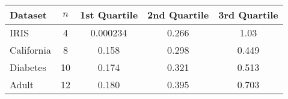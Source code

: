 \begin{tabular}{lcccc}
    \toprule
    Dataset & $n$ & 1st Quartile & 2nd Quartile & 3rd Quartile \\
    \midrule
    IRIS & 4 & 0.000234 & 0.266 & 1.03 \\
    California & 8 & 0.158 & 0.298 & 0.449 \\
    Diabetes & 10 & 0.174 & 0.321 & 0.513 \\
    Adult & 12 & 0.180 & 0.395 & 0.703 \\
    \bottomrule
\end{tabular}
